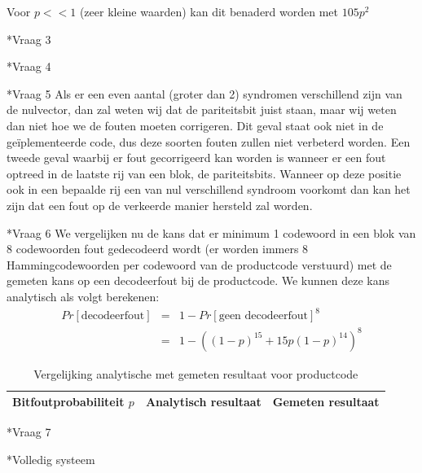 \documentclass[]{article}
\begin{document}
\begin{section}
\begin{subsection}
    	Voor $p << 1$ (zeer kleine waarden) kan dit benaderd worden met $105p^2$
    \end{subsection}

    \begin{subsection}*{Vraag 3} %
    \end{subsection}

    \begin{subsection}*{Vraag 4} %
    \end{subsection}

    \begin{subsection}*{Vraag 5} %
    	Als er een even aantal (groter dan 2) syndromen verschillend zijn van de nulvector,
    	dan zal weten wij dat de pariteitsbit juist staan, maar wij weten dan niet hoe we
    	de fouten moeten corrigeren. Dit geval staat ook niet in de ge\"iplementeerde code,
    	dus deze soorten fouten zullen niet verbeterd worden.
    	Een tweede geval waarbij er fout gecorrigeerd kan worden is wanneer er een fout
    	optreed in de laatste rij van een blok, de pariteitsbits. Wanneer op deze positie
    	ook in een bepaalde rij een van nul verschillend syndroom voorkomt dan kan het zijn
    	dat een fout op de verkeerde manier hersteld zal worden.
    \end{subsection}

    \begin{subsection}*{Vraag 6} %
   	We vergelijken nu de kans dat er minimum 1 codewoord in een blok van 8 codewoorden fout gedecodeerd wordt (er worden immers 8 Hammingcodewoorden per codewoord van de productcode verstuurd) met de gemeten kans op een decodeerfout bij de productcode.
	We kunnen deze kans analytisch als volgt berekenen:
    	\begin{eqnarray*}
		Pr[\text{decodeerfout}]&=& 1 - Pr[\text{geen decodeerfout}]^8 \\ 
						&=& 1 - ((1-p)^{15} + 15p(1-p)^{14})^8
	\end{eqnarray*}

	    	\begin{table}[htpb]
    		\centering	
    		\begin{tabular}{r|r|r}
    		Bitfoutprobabiliteit $p$ & Analytisch resultaat & Gemeten resultaat \\
    		\hline
    		\end{tabular}
    		\caption{Vergelijking analytische met gemeten resultaat voor productcode}
    	\end{table}
    \end{subsection}

    \begin{subsection}*{Vraag 7} %
    \end{subsection}

\end{section}

\begin{section}*{Volledig systeem} %
\end{section}
\end{document}

